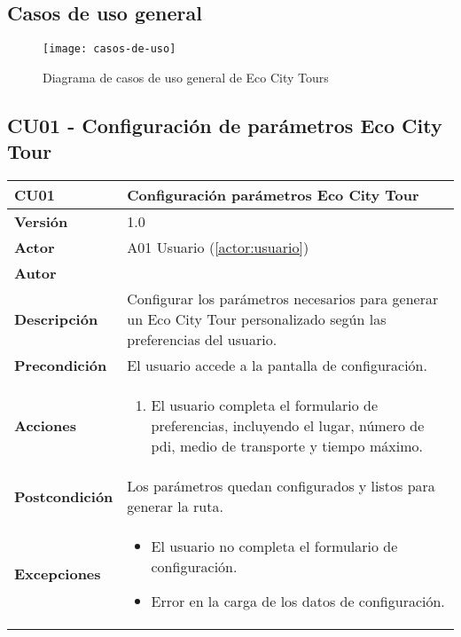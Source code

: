\subsection{Casos de uso general}

\begin{figure}[H]
	\centering
	\hspace*{-2cm}
	\texttt{[image: casos-de-uso]}
	\caption{Diagrama de casos de uso general de Eco City Tours}
	\label{fig:casos-de-uso}
\end{figure}

\subsection{CU01 - Configuración de parámetros Eco City Tour}

\begin{table}[H]
	\centering
	\begin{tabularx}{\linewidth}{ p{} p{} }
		\toprule
		\textbf{CU01}    & \textbf{Configuración parámetros Eco City Tour} \\
		\toprule
		\textbf{Versión}              & 1.0    \\
		\textbf{Actor}                & A01 Usuario (\ref{actor:usuario}) \\
		\textbf{Autor}                & \autor \\
		\textbf{Descripción}          & Configurar los parámetros necesarios para generar un Eco City Tour personalizado según las preferencias del usuario. \\
		\textbf{Precondición}         & El usuario accede a la pantalla de configuración. \\
		\textbf{Acciones}             &
		\begin{enumerate}
			\def\labelenumi{\arabic{enumi}.}
			\tightlist
			\item El usuario completa el formulario de preferencias, incluyendo el lugar, número de \acrshort{pdi}, medio de transporte y tiempo máximo.
		\end{enumerate}\\
		\textbf{Postcondición}        & Los parámetros quedan configurados y listos para generar la ruta. \\
		\textbf{Excepciones}          & 
		\begin{itemize}
			\tightlist
			\item El usuario no completa el formulario de configuración.
			\item Error en la carga de los datos de configuración.

\end{itemize}
\end{tabularx}
\end{table}
